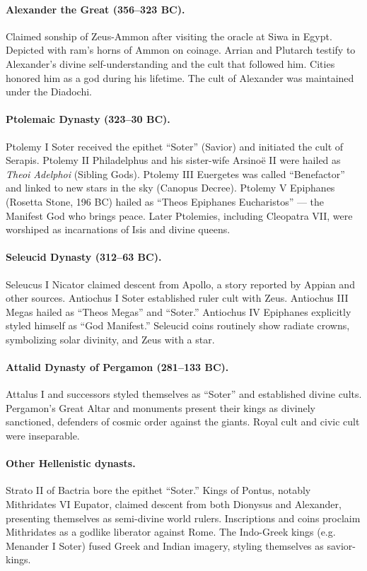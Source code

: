 \paragraph{Alexander the Great (356–323 BC).}
Claimed sonship of Zeus-Ammon after visiting the oracle at Siwa in Egypt.
Depicted with ram’s horns of Ammon on coinage.
Arrian and Plutarch testify to Alexander’s divine self-understanding and the cult that followed him.
Cities honored him as a god during his lifetime.
The cult of Alexander was maintained under the Diadochi.

\paragraph{Ptolemaic Dynasty (323–30 BC).}
Ptolemy I Soter received the epithet “Soter” (Savior) and initiated the cult of Serapis.
Ptolemy II Philadelphus and his sister-wife Arsinoë II were hailed as \textit{Theoi Adelphoi} (Sibling Gods).
Ptolemy III Euergetes was called “Benefactor” and linked to new stars in the sky (Canopus Decree).
Ptolemy V Epiphanes (Rosetta Stone, 196 BC) hailed as “Theos Epiphanes Eucharistos” — the Manifest God who brings peace.
Later Ptolemies, including Cleopatra VII, were worshiped as incarnations of Isis and divine queens.

\paragraph{Seleucid Dynasty (312–63 BC).}
Seleucus I Nicator claimed descent from Apollo, a story reported by Appian and other sources.
Antiochus I Soter established ruler cult with Zeus.
Antiochus III Megas hailed as “Theos Megas” and “Soter.”
Antiochus IV Epiphanes explicitly styled himself as “God Manifest.”
Seleucid coins routinely show radiate crowns, symbolizing solar divinity, and Zeus with a star.

\paragraph{Attalid Dynasty of Pergamon (281–133 BC).}
Attalus I and successors styled themselves as “Soter” and established divine cults.
Pergamon’s Great Altar and monuments present their kings as divinely sanctioned, defenders of cosmic order against the giants.
Royal cult and civic cult were inseparable.

\paragraph{Other Hellenistic dynasts.}
Strato II of Bactria bore the epithet “Soter.”
Kings of Pontus, notably Mithridates VI Eupator, claimed descent from both Dionysus and Alexander, presenting themselves as semi-divine world rulers.
Inscriptions and coins proclaim Mithridates as a godlike liberator against Rome.
The Indo-Greek kings (e.g. Menander I Soter) fused Greek and Indian imagery, styling themselves as savior-kings.

